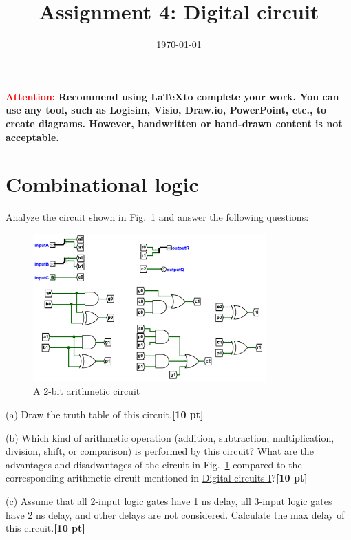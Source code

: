 \documentclass[a4paper]{article}
\date{\today}
\title{Assignment 4: Digital circuit}
\begin{document}
    \header{}
\textcolor{red}{\textbf{Attention: }}
\textbf{Recommend using \LaTeX to complete your work. You can use any tool, such as Logisim, Visio, Draw.io, PowerPoint, etc., to create diagrams. However, handwritten or hand-drawn content is not acceptable.}

\section{Combinational logic}
Analyze the circuit shown in Fig.~\ref{fig:circuit} and answer the following questions:
\begin{figure}[htbp]
    \centering
    \includegraphics[width=0.8\textwidth]{circuit.png}
    \caption{A 2-bit arithmetic circuit}
    \label{fig:circuit}
\end{figure}

(a) Draw the truth table of this circuit.\textbf{[10 pt]}

(b) Which kind of arithmetic operation (addition, subtraction, multiplication, division, shift, or comparison) is performed by this circuit? What are the advantages and disadvantages of the circuit in Fig.~\ref{fig:circuit} compared to the corresponding arithmetic circuit mentioned in \href{https://toast-lab.sist.shanghaitech.edu.cn/courses/CS110@ShanghaiTech/Spring-2024/lecture_notes/L09.\%20Digital\%20circuits\%20and\%20systems\%201.pdf}{Digital circuits I}?\textbf{[10 pt]}

(c) Assume that all 2-input logic gates have 1 ns delay, all 3-input logic gates have 2 ns delay, and other delays are not considered. Calculate the max delay of this circuit.\textbf{[10 pt]}
\end{document}
